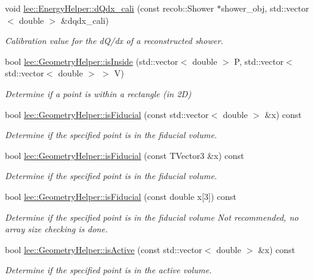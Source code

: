 \begin{DoxyCompactItemize}
void \hyperlink{group__lee_ga4926738bfba2d91bc187ad8a7db6e997}{lee\-::\-Energy\-Helper\-::d\-Qdx\-\_\-cali} (const recob\-::\-Shower $\ast$shower\-\_\-obj, std\-::vector$<$ double $>$ \&dqdx\-\_\-cali)
\begin{DoxyCompactList}\small\item\em Calibration value for the d\-Q/dx of a reconstructed shower. \end{DoxyCompactList}\item 
bool \hyperlink{group__lee_ga4d4f0303130ac496452b30f60f43f5f1}{lee\-::\-Geometry\-Helper\-::is\-Inside} (std\-::vector$<$ double $>$ P, std\-::vector$<$ std\-::vector$<$ double $>$ $>$ V)
\begin{DoxyCompactList}\small\item\em Determine if a point is within a rectangle (in 2\-D) \end{DoxyCompactList}\item 
bool \hyperlink{group__lee_ga6d02792fc6869b86d850077460536b2a}{lee\-::\-Geometry\-Helper\-::is\-Fiducial} (const std\-::vector$<$ double $>$ \&x) const 
\begin{DoxyCompactList}\small\item\em Determine if the specified point is in the fiducial volume. \end{DoxyCompactList}\item 
bool \hyperlink{group__lee_ga5383a8e03c66e9506a75d9afc41f5ff0}{lee\-::\-Geometry\-Helper\-::is\-Fiducial} (const T\-Vector3 \&x) const 
\begin{DoxyCompactList}\small\item\em Determine if the specified point is in the fiducial volume. \end{DoxyCompactList}\item 
bool \hyperlink{group__lee_gae10d0ef387b7573c6cc12565d5bfd0e1}{lee\-::\-Geometry\-Helper\-::is\-Fiducial} (const double x\mbox{[}3\mbox{]}) const 
\begin{DoxyCompactList}\small\item\em Determine if the specified point is in the fiducial volume Not recommended, no array size checking is done. \end{DoxyCompactList}\item 
bool \hyperlink{group__lee_gaaa423d79bbb62bdd3337f1d965023baa}{lee\-::\-Geometry\-Helper\-::is\-Active} (const std\-::vector$<$ double $>$ \&x) const 
\begin{DoxyCompactList}\small\item\em Determine if the specified point is in the active volume. \end{DoxyCompactList}\item 

\end{DoxyCompactItemize}
